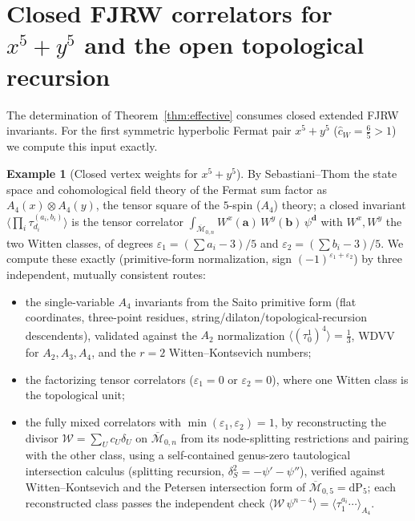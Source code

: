 \documentclass[11pt]{amsart}
\theoremstyle{definition}
\newtheorem{example}[theorem]{Example}
\theoremstyle{remark}
\newcommand{\chat}{\hat{c}}
\newcommand{\Mbar}{\overline{\mathcal{M}}}
\begin{document}
\section{Closed FJRW correlators for
\texorpdfstring{$x^{5}+y^{5}$}{x5+y5} and the open topological recursion}
\label{sec:x5y5}

The determination of Theorem~\ref{thm:effective} consumes closed extended FJRW
invariants. For the first symmetric hyperbolic Fermat pair $x^{5}+y^{5}$
($\chat_{W}=\tfrac65>1$)
we compute this input exactly.

\begin{example}[Closed vertex weights for $x^{5}+y^{5}$]
\label{ex:x5y5}
By Sebastiani--Thom the state space and cohomological field theory of the Fermat
sum factor as $A_{4}(x)\otimes A_{4}(y)$, the tensor square of the $5$-spin
($A_{4}$) theory; a closed invariant
$\langle\prod_{i}\tau_{d_{i}}^{(a_{i},b_{i})}\rangle$ is the tensor correlator
$\int_{\Mbar_{0,n}}W^{x}(\mathbf a)\,W^{y}(\mathbf b)\,\psi^{\mathbf d}$ with
$W^{x},W^{y}$ the two Witten classes, of degrees $\varepsilon_{1}=(\sum a_{i}-3)/5$ and
$\varepsilon_{2}=(\sum b_{i}-3)/5$. We compute these exactly (primitive-form normalization,
sign $(-1)^{\varepsilon_{1}+\varepsilon_{2}}$) by three independent, mutually consistent routes:
\begin{itemize}\itemsep2pt
\item the single-variable $A_{4}$ invariants from the Saito primitive form (flat
coordinates, three-point residues, string/dilaton/topological-recursion
descendents), validated against the $A_{2}$ normalization
$\langle(\tau_{0}^{1})^{4}\rangle=\tfrac13$, WDVV for $A_{2},A_{3},A_{4}$, and the
$r=2$ Witten--Kontsevich numbers;
\item the factorizing tensor correlators ($\varepsilon_{1}=0$ or $\varepsilon_{2}=0$), where one
Witten class is the topological unit;
\item the fully mixed correlators with $\min(\varepsilon_{1},\varepsilon_{2})=1$, by reconstructing
the divisor $\mathcal W=\sum_{U}c_{U}\delta_{U}$ on $\Mbar_{0,n}$ from its node-splitting
restrictions and pairing with the other class, using a self-contained genus-zero
tautological intersection calculus (splitting recursion,
$\delta_{S}^{2}=-\psi'-\psi''$), verified against Witten--Kontsevich and the
Petersen intersection form of $\Mbar_{0,5}=\mathrm{dP}_{5}$; each reconstructed
class passes the independent check $\langle \mathcal W\,\psi^{n-4}\rangle
=\langle\tau_{1}^{a_{i}}\cdots\rangle_{A_{4}}$.
\end{itemize}

\end{example}
\end{document}

